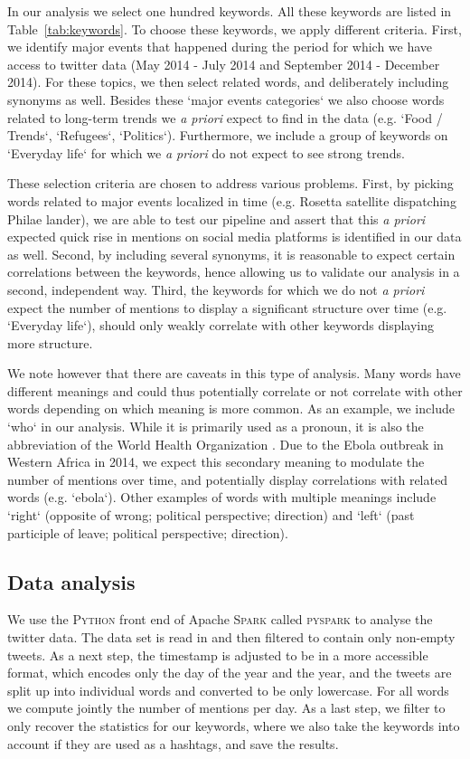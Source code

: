 \documentclass[12pt, a4paper]{article}
\begin{document}
In our analysis we select one hundred keywords. All these keywords are listed in Table~\ref{tab:keywords}. To choose these keywords, we apply different criteria. First, we identify major events that happened during the period for which we have access to twitter data (May 2014 - July 2014 and September 2014 - December 2014). For these topics, we then select related words, and deliberately including synonyms as well. Besides these `major events categories` we also choose words related to long-term trends we {\it a priori} expect to find in the data (e.g. `Food / Trends`, `Refugees`, `Politics`). Furthermore, we include a group of keywords on `Everyday life` for which we {\it a priori} do not expect to see strong trends.

These selection criteria are chosen to address various problems. First, by picking words related to major events localized in time (e.g. Rosetta satellite \cite{rosetta} dispatching Philae lander), we are able to test our pipeline and assert that this {\it a priori} expected quick rise in mentions on social media platforms is identified in our data as well. Second, by including several synonyms, it is reasonable to expect certain correlations between the keywords, hence allowing us to validate our analysis in a second, independent way. Third, the keywords for which we do not {\it a priori} expect the number of mentions to display a significant structure over time (e.g. `Everyday life`), should only weakly correlate with other keywords displaying more structure.

We note however that there are caveats in this type of analysis. Many words have different meanings and could thus potentially correlate or not correlate with other words depending on which meaning is more common. As an example, we include `who` in our analysis. While it is primarily used as a pronoun, it is also the abbreviation of the World Health Organization \cite{who}. Due to the Ebola outbreak in Western Africa in 2014, we expect this secondary meaning to modulate the number of mentions over time, and potentially display correlations with related words (e.g. `ebola`). Other examples of words with multiple meanings include `right` (opposite of wrong; political perspective; direction) and `left` (past participle of leave; political perspective; direction).

\subsection{Data analysis}
We use the \textsc{Python} front end of Apache \textsc{Spark}\cite{pyspark} called \textsc{pyspark} to analyse the twitter data. The data set is read in and then filtered to contain only non-empty tweets. As a next step, the timestamp is adjusted to be in a more accessible format, which encodes only the day of the year and the year, and the tweets are split up into individual words and converted to be only lowercase. For all words we compute jointly the number of mentions per day. As a last step, we filter to only recover the statistics for our keywords, where we also take the keywords into account if they are used as a hashtags, and save the results.
\end{document}
